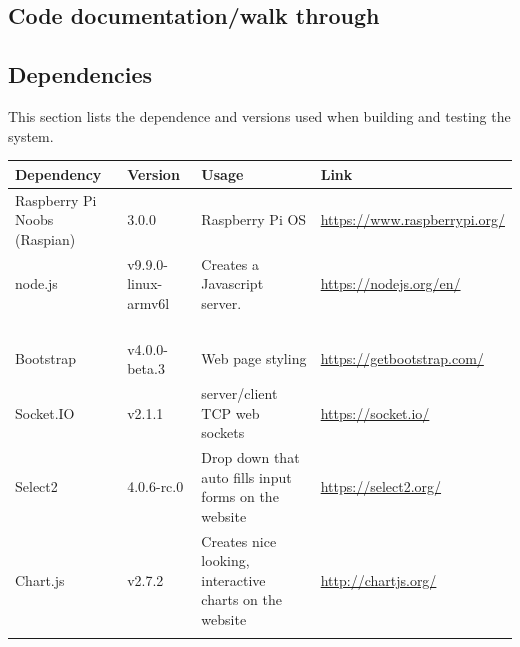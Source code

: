 \documentclass[12pt]{article}
\begin{document}
\subsection{Code documentation/walk through}
\subsection{Dependencies}
This section lists the dependence and versions used when building and testing the system.\\
\begin{center}
	\begin{tabularx}{\textwidth}{ |X|X|X|X| }
		\hline
		\textbf{Dependency} & \textbf{Version} & \textbf{Usage} & \textbf{Link}\\ 
		\hline
		Raspberry Pi Noobs (Raspian) & 3.0.0 & Raspberry Pi OS & \url{https://www.raspberrypi.org/}\\ 
		\hline
		node.js & v9.9.0-linux-armv6l & Creates a Javascript server. & \url{https://nodejs.org/en/}\\ 
		\hline
		 &  &  & \url{}\\ 
		\hline
		 &  &  & \url{}\\ 
		\hline
		 &  &  & \url{}\\ 
		\hline
		 &  &  & \url{}\\ 
		\hline
		Bootstrap & v4.0.0-beta.3 & Web page styling & \url{https://getbootstrap.com/}\\ 
		\hline
		Socket.IO & v2.1.1 & server/client TCP web sockets & \url{https://socket.io/}\\ 
		\hline
		Select2 & 4.0.6-rc.0 & Drop down that auto fills input forms on the website & \url{https://select2.org/}\\ 
		\hline
		Chart.js & v2.7.2 & Creates nice looking, interactive charts on the website & \url{http://chartjs.org/}\\ 
		\hline
		 &  &  & \url{}\\ 
		\hline
		
		
		  
	\end{tabularx}
\end{center}
\end{document}
